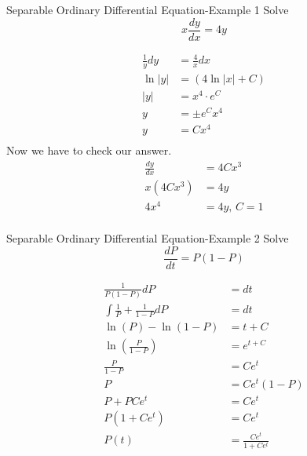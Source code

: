 \begin{example}[]{Separable Ordinary Differential Equation-Example 1}
  Solve \[ x \frac{dy}{dx} = 4y \]

  \tcblower

  \begin{align*}
    \frac{1}{y} dy &= \frac{4}{x} dx \\
    \ln \lvert y \rvert &= \left( 4 \ln \lvert x \rvert + C \right) \\
    \lvert y \rvert &= x^{4} \cdot e^{C} \\
    y &= \pm e^{C}x^{4} \\
    y &= C x^{4} \\
  \end{align*}
  Now we have to check our answer.
  \begin{align*}
    \frac{dy}{dx} &= 4 C x^{3} \\
    x \left( 4 C x^{3} \right) &= 4y \\
    4 x^{4} &= 4y \text{, } C = 1 \\
  \end{align*}
\end{example}
\begin{example}[]{Separable Ordinary Differential Equation-Example 2}
  Solve \[ \frac{dP}{dt} = P \left( 1-P \right) \]

  \tcblower

  \begin{align*}
    \frac{1}{P \left( 1-P \right)} dP &= dt \\
    \int \frac{1}{P} + \frac{1}{1-P} dP &= dt \\
    \ln \left( P \right) - \ln \left( 1-P \right) &= t + C \\
    \ln \left( \frac{P}{1-P} \right) &= e^{t+C} \\
    \frac{P}{1-P} &= C e^{t} \\
    P &= C e^{t} \left( 1-P \right) \\
    P + PC e^{t} &= Ce^{t} \\
    P \left( 1+ Ce^{t} \right) &= C e^{t} \\
    P \left( t \right) &= \frac{Ce^{t}}{1+Ce^{t}}
  \end{align*}
\end{example}
